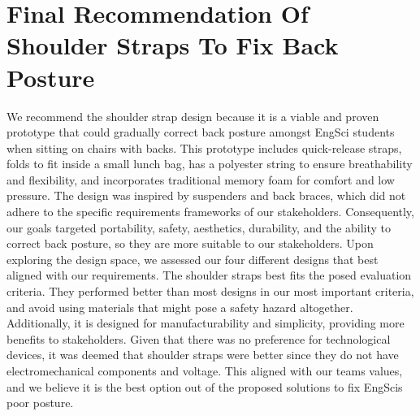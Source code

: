 \documentclass[11pt]{article}
\begin{document}
\section{Final Recommendation Of Shoulder Straps To Fix Back Posture}
We recommend the shoulder strap design because it is a viable and proven prototype that could gradually correct back posture amongst EngSci students when sitting on chairs with backs. This prototype includes quick-release straps, folds to fit inside a small lunch bag, has a polyester string to ensure breathability and flexibility, and incorporates traditional memory foam for comfort and low pressure. The design was inspired by suspenders and back braces, which did not adhere to the specific requirements frameworks of our stakeholders. Consequently, our goals targeted portability, safety, aesthetics, durability, and  the ability to correct back posture, so they are more suitable to our stakeholders. 
Upon exploring the design space, we assessed our four different designs that best aligned with our requirements. The shoulder straps best fits the posed evaluation criteria. They performed better than most designs in our most important criteria, and avoid using materials that might pose a safety hazard altogether. Additionally, it is designed for manufacturability and simplicity, providing more benefits to stakeholders. Given that there was no preference for technological devices, it was deemed that shoulder straps were better since they do not have electromechanical components and voltage. This aligned with our teams values, and we believe it is the best option out of the proposed solutions to fix EngScis poor posture.
\end{document}

